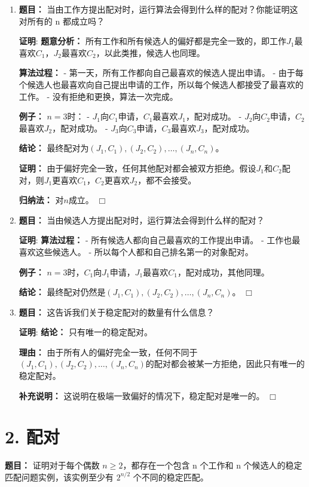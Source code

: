 \documentclass[11pt]{article}
\newenvironment{qparts}{\begin{enumerate}[{(}a{)}]}{\end{enumerate}}
\def\endproofmark{$\Box$}
\newenvironment{proof}{\par{\bf 证明}:}{\endproofmark\smallskip}
\begin{document}
\begin{qparts}
\item \textbf{题目：} 当由工作方提出配对时，运行算法会得到什么样的配对？你能证明这对所有的 n 都成立吗？
\begin{proof}
\textbf{题意分析：} 所有工作和所有候选人的偏好都是完全一致的，即工作$J_1$最喜欢$C_1$，$J_2$最喜欢$C_2$，以此类推，候选人也同理。

\textbf{算法过程：}
- 第一天，所有工作都向自己最喜欢的候选人提出申请。
- 由于每个候选人也最喜欢向自己提出申请的工作，所以每个候选人都接受了最喜欢的工作。
- 没有拒绝和更换，算法一次完成。

\textbf{例子：} $n=3$时：
- $J_1$向$C_1$申请，$C_1$最喜欢$J_1$，配对成功。
- $J_2$向$C_2$申请，$C_2$最喜欢$J_2$，配对成功。
- $J_3$向$C_3$申请，$C_3$最喜欢$J_3$，配对成功。

\textbf{结论：} 最终配对为$(J_1,C_1),(J_2,C_2),\ldots,(J_n,C_n)$。

\textbf{证明：} 由于偏好完全一致，任何其他配对都会被双方拒绝。假设$J_1$和$C_2$配对，则$J_1$更喜欢$C_1$，$C_2$更喜欢$J_2$，都不会接受。

\textbf{归纳法：} 对$n$成立。
\end{proof}

\item \textbf{题目：} 当由候选人方提出配对时，运行算法会得到什么样的配对？
\begin{proof}
\textbf{算法过程：}
- 所有候选人都向自己最喜欢的工作提出申请。
- 工作也最喜欢这些候选人。
- 所以每个人都和自己排名第一的对象配对。

\textbf{例子：} $n=3$时，$C_1$向$J_1$申请，$J_1$最喜欢$C_1$，配对成功，其他同理。

\textbf{结论：} 最终配对仍然是$(J_1,C_1),(J_2,C_2),\ldots,(J_n,C_n)$。
\end{proof}

\item \textbf{题目：} 这告诉我们关于稳定配对的数量有什么信息？
\begin{proof}
\textbf{结论：} 只有唯一的稳定配对。

\textbf{理由：} 由于所有人的偏好完全一致，任何不同于$(J_1,C_1),(J_2,C_2),\ldots,(J_n,C_n)$的配对都会被某一方拒绝，因此只有唯一的稳定配对。

\textbf{补充说明：} 这说明在极端一致偏好的情况下，稳定配对是唯一的。
\end{proof}
\end{qparts}

\section*{2. 配对}
\textbf{题目：} 证明对于每个偶数 $n\ge2$，都存在一个包含 n 个工作和 n 个候选人的稳定匹配问题实例，该实例至少有 $2^{n/2}$ 个不同的稳定匹配。
\end{document}
